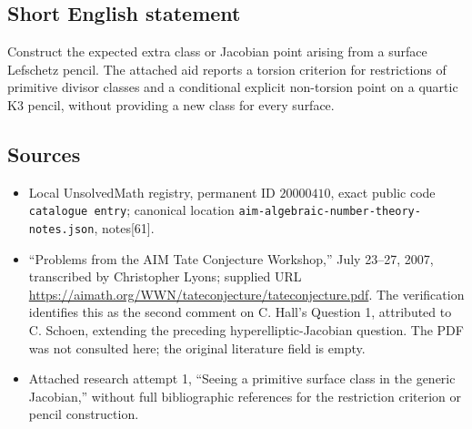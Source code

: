 \documentclass[11pt]{article}
\begin{document}
\subsection{Short English statement}
Construct the expected extra class or Jacobian point arising from a surface Lefschetz pencil. The attached aid reports a torsion criterion for restrictions of primitive divisor classes and a conditional explicit non-torsion point on a quartic K3 pencil, without providing a new class for every surface.
\subsection{Sources}
\begin{itemize}
\item Local UnsolvedMath registry, permanent ID \(20000410\), exact public code \texttt{catalogue entry}; canonical location \texttt{aim-algebraic-number-theory-notes.json}, notes[61].
\item ``Problems from the AIM Tate Conjecture Workshop,'' July 23--27, 2007, transcribed by Christopher Lyons; supplied URL \url{https://aimath.org/WWN/tateconjecture/tateconjecture.pdf}. The verification identifies this as the second comment on C. Hall's Question 1, attributed to C. Schoen, extending the preceding hyperelliptic-Jacobian question. The PDF was not consulted here; the original literature field is empty.
\item Attached research attempt 1, ``Seeing a primitive surface class in the generic Jacobian,'' without full bibliographic references for the restriction criterion or pencil construction.
\end{itemize}
\end{document}

